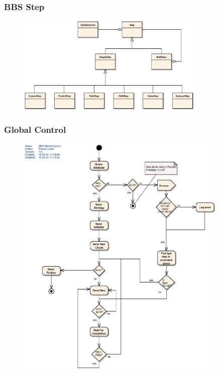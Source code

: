 \documentclass[10pt]{lofar}
\begin{document}
\subsubsection{BBS Step}
\label{subsubsec:design-step}
\begin{figure}[!ht]
\centering
\includegraphics[width=0.8\textwidth]{images/bbs-step-class-diagram}
\end{figure}

\subsubsection{Global Control}
\label{subsubsec:design-global-control}
\begin{figure}[!ht]
\centering
\includegraphics[width=0.9\textwidth]{images/bbs-global-control-activity-diagram}
\end{figure}
\end{document}
